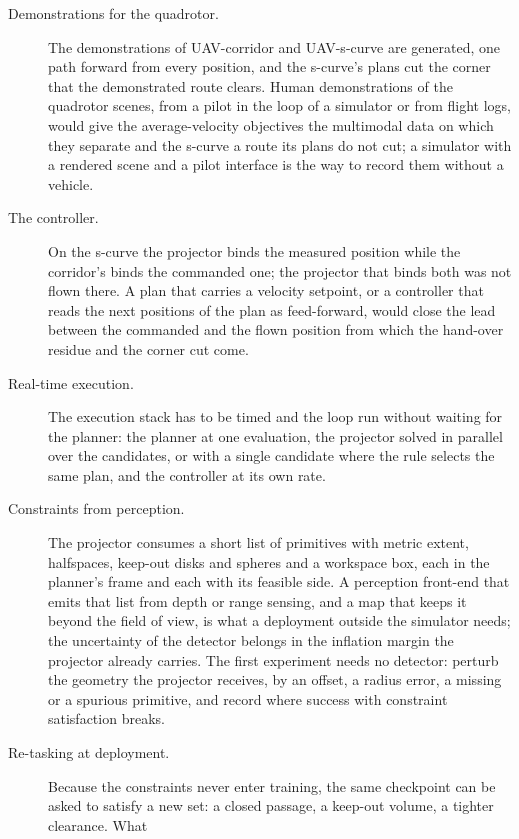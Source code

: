 \begin{description}
  \item[Demonstrations for the quadrotor.] The demonstrations of UAV-corridor and UAV-s-curve are
    generated, one path forward from every position, and the s-curve's plans cut the corner that the
    demonstrated route clears. Human demonstrations of the quadrotor scenes, from a pilot in the loop
    of a simulator or from flight logs, would give the average-velocity objectives the multimodal data
    on which they separate and the s-curve a route its plans do not cut; a simulator with a rendered
    scene and a pilot interface is the way to record them without a vehicle.
  \item[The controller.] On the s-curve the projector binds the measured position while the
    corridor's binds the commanded one; the projector that binds both was not flown there. A plan that
    carries a velocity setpoint, or a controller that reads the next positions of the plan as
    feed-forward, would close the lead between the commanded and the flown position from which the
    hand-over residue and the corner cut come.
  \item[Real-time execution.] The execution stack has to be timed and the loop run without waiting for
    the planner: the planner at one evaluation, the projector solved in parallel over the candidates,
    or with a single candidate where the rule selects the same plan, and the controller at its own rate.
  \item[Constraints from perception.] The projector consumes a short list of primitives with metric
    extent, halfspaces, keep-out disks and spheres and a workspace box, each in the planner's frame and
    each with its feasible side. A perception front-end that emits that list from depth or range
    sensing, and a map that keeps it beyond the field of view, is what a deployment outside the
    simulator needs; the uncertainty of the detector belongs in the inflation margin the projector
    already carries. The first experiment needs no detector: perturb the geometry the projector
    receives, by an offset, a radius error, a missing or a spurious primitive, and record where success
    with constraint satisfaction breaks.
  \item[Re-tasking at deployment.] Because the constraints never enter training, the same checkpoint
    can be asked to satisfy a new set: a closed passage, a keep-out volume, a tighter clearance. What

\end{description}
